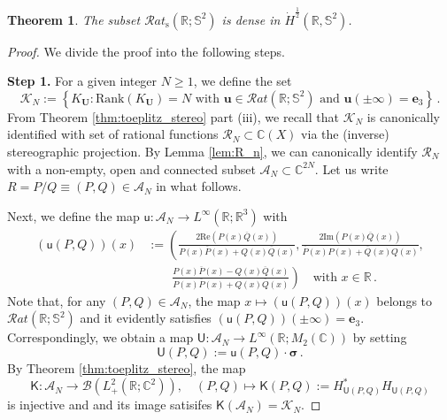 \documentclass[11pt,reqno]{amsart}
\newtheorem{thm}{Theorem}[section]
\theoremstyle{definition}
\theoremstyle{remark}
\theoremstyle{remark}
\numberwithin{equation}{section}
\newcommand{\C}{\mathbb{C}}
\newcommand{\R}{\mathbb{R}}
\newcommand{\Ss}{\mathbb{S}}
\newcommand{\ov}{\overline}
\newcommand{\be}{\begin{equation}}
\newcommand{\ee}{\end{equation}}
\newcommand{\uu}{\mathbf{u}}
\newcommand{\Ub}{\mathbf{U}}
\begin{document}
\begin{thm} \label{thm:simple}
The subset $\mathcal{R}at_{\mathrm{s}}(\R; \Ss^2)$ is dense in $\dot{H}^{\frac 1 2}(\R, \Ss^2)$.
\end{thm}

\begin{proof}
 We divide the proof into the following steps.

\medskip
\textbf{Step 1.} For a given integer $N \geq 1$, we define the set
$$
\mathcal{K}_N := \left \{ K_{\Ub}  : \mbox{$\mathrm{Rank}(K_\Ub) = N$ with $\uu \in \mathcal{R}at(\R; \Ss^2)$ and $\uu(\pm \infty) = \mathbf{e}_3$} \right \} \, .
$$
From Theorem \ref{thm:toeplitz_stereo} part (iii), we recall that $\mathcal{K}_N$ is canonically identified with set of rational functions $\mathcal{R}_N \subset \C(X)$ via the (inverse) stereographic projection. By Lemma \ref{lem:R_n}, we can canonically identify $\mathcal{R}_N$  with a non-empty, open and connected subset $\mathcal{A}_N \subset \C^{2N}$. Let us write $R=P/Q \equiv (P,Q) \in \mathcal{A}_N$ in what follows. 

Next, we define the map $\mathsf{u} : \mathcal{A}_N \to L^\infty(\R; \R^3)$ with
\begin{align*}
(\mathsf{u}(P,Q))(x) & :=\left ( \frac{ 2 \mathrm{Re} (P(x) \ov{Q}(x))}{P(x) \ov{P}(x) + Q(x) \ov{Q}(x)}, \frac{2 \mathrm{Im}( P(x) \ov{Q}(x))}{  \ov{P}(x) P(x) + \ov{Q}(x) Q(x)}, \right . \\
& \qquad \left . \frac{P(x) \ov{P}(x) - Q(x) \ov{Q}(x)}{P(x) \ov{P}(x) + Q(x) \ov{Q}(x)} \right ) \quad \mbox{with $x \in \R$} \, .
\end{align*}
Note that, for any $(P,Q) \in \mathcal{A}_N$, the map $x \mapsto (\mathsf{u}(P,Q))(x)$  belongs to $\mathcal{R}at(\R; \Ss^2)$ and it evidently satisfies $(\mathsf{u}(P,Q))(\pm \infty) = \mathbf{e}_3$. Correspondingly, we obtain a map $\mathsf{U} : \mathcal{A}_N \to L^\infty(\R; M_2(\C))$ by setting
\be \label{eq:analytic1}
\mathsf{U}(P,Q) := \mathsf{u}(P,Q) \cdot \bm{\sigma} \, .
\ee
By Theorem \ref{thm:toeplitz_stereo}, the map
\be \label{eq:analytic2}
\mathsf{K} : \mathcal{A}_N \to \mathcal{B}(L^2_+(\R; \C^2)), \quad (P,Q) \mapsto \mathsf{K}(P,Q) := H_{\mathsf{U}(P,Q)}^* H_{\mathsf{U}(P,Q)} 
\ee
is injective and and its image satisifes $\mathsf{K}(\mathcal{A}_N) = \mathcal{K}_N$. 


\end{proof}
\end{document}
